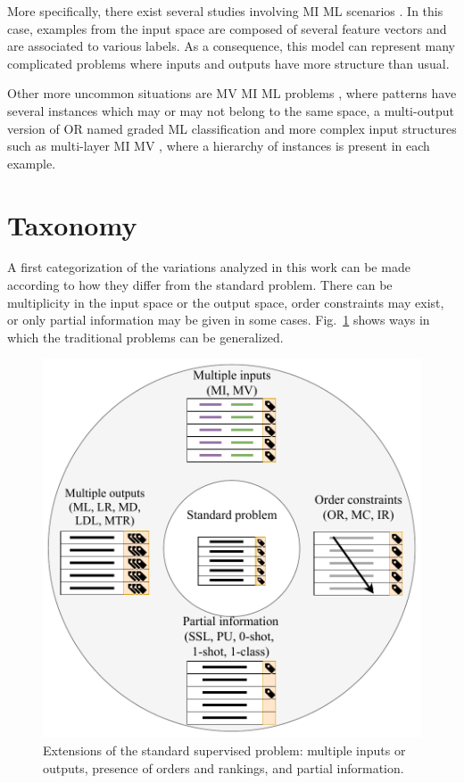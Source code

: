 More specifically, there exist several studies involving MI ML scenarios . In this case, examples from the input space are composed of several feature vectors and are associated to various labels. As a consequence, this model can represent many complicated problems where inputs and outputs have more structure than usual.

Other more uncommon situations are MV MI ML problems , where patterns have several instances which may or may not belong to the same space, a multi-output version of OR named graded ML classification  and more complex input structures such as multi-layer MI MV , where a hierarchy of instances is present in each example. 

\section{Taxonomy}
\label{p3sec:taxonomy}

A first categorization of the variations analyzed in this work can be made according to how they differ from the standard problem. There can be multiplicity in the input space or the output space, order constraints may exist, or only partial information may be given in some cases. Fig.~\ref{p3fig.multiples} shows ways in which the traditional problems can be generalized. 

\begin{figure}[ht]
\centering
\includegraphics[width=.65\textwidth]{problems2}
\caption[Extensions of the standard supervised problem.]{\label{p3fig.multiples}Extensions of the standard supervised problem: multiple inputs or outputs, presence of orders and rankings, and partial information.}
\end{figure}

